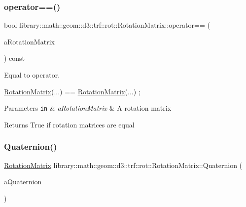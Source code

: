 \subsubsection{\texorpdfstring{operator==()}{operator==()}}
{\footnotesize\ttfamily bool library\+::math\+::geom\+::d3\+::trf\+::rot\+::\+Rotation\+Matrix\+::operator== (\begin{DoxyParamCaption}\item[{const \hyperlink{classlibrary_1_1math_1_1geom_1_1d3_1_1trf_1_1rot_1_1_rotation_matrix}{Rotation\+Matrix} \&}]{a\+Rotation\+Matrix }\end{DoxyParamCaption}) const}



Equal to operator. 


\begin{DoxyCode}
\hyperlink{classlibrary_1_1math_1_1geom_1_1d3_1_1trf_1_1rot_1_1_rotation_matrix_a7f1184694020cb4f963d58931324ab06}{RotationMatrix}(...) == \hyperlink{classlibrary_1_1math_1_1geom_1_1d3_1_1trf_1_1rot_1_1_rotation_matrix_a7f1184694020cb4f963d58931324ab06}{RotationMatrix}(...) ;
\end{DoxyCode}



\begin{DoxyParams}[1]{Parameters}
\mbox{\tt in}  & {\em a\+Rotation\+Matrix} & A rotation matrix \\
\hline
\end{DoxyParams}
\begin{DoxyReturn}{Returns}
True if rotation matrices are equal 
\end{DoxyReturn}
\mbox{\label{classlibrary_1_1math_1_1geom_1_1d3_1_1trf_1_1rot_1_1_rotation_matrix_a55511f2734e537277092905958d56d23}} 
\subsubsection{\texorpdfstring{Quaternion()}{Quaternion()}}
{\footnotesize\ttfamily \hyperlink{classlibrary_1_1math_1_1geom_1_1d3_1_1trf_1_1rot_1_1_rotation_matrix}{Rotation\+Matrix} library\+::math\+::geom\+::d3\+::trf\+::rot\+::\+Rotation\+Matrix\+::\+Quaternion (\begin{DoxyParamCaption}\item[{const \hyperlink{classlibrary_1_1math_1_1geom_1_1d3_1_1trf_1_1rot_1_1_quaternion}{rot\+::\+Quaternion} \&}]{a\+Quaternion }\end{DoxyParamCaption})\hspace{0.3cm}{\ttfamily [static]}}



